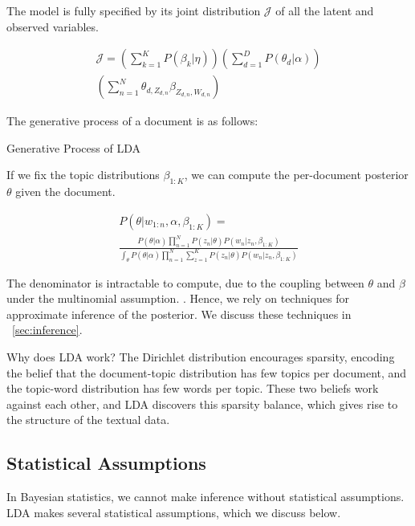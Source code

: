 \documentclass[letterpaper]{article}
\begin{document}
The model is fully specified by its joint distribution $\mathcal{J}$
of all the latent and observed variables.

\begin{multline}
 \mathcal{J} = \left( \sum_{k=1}^{K} P(\beta_k | \eta) \right) \left(
    \sum_{d=1}^{D} P(\theta_d | \alpha) \right) \\
  \left( \sum_{n=1}^{N} \theta_{d, Z_{d,n}} \beta_{Z_{d,n}, W_{d,n}} \right)  
\end{multline}

The generative process of a document is as follows:

\begin{algorithm}
  \caption{Generative Process of LDA}\label{alg:LDA}
  \begin{algorithmic}[1]
    \EndFor
    \EndFor
  \end{algorithmic}
\end{algorithm}

If we fix the topic distributions $\beta_{1:K}$, we can compute the
per-document posterior $\theta$ given the document.

\begin{multline}
  P(\theta | w_{1:n}, \alpha, \beta_{1:K}) = \\ \frac{P(\theta |
    \alpha)\prod_{n=1}^{N} P(z_n | \theta) P(w_n | z_n,
    \beta_{1:K})}{\int_\theta P(\theta | \alpha) \prod_{n=1}^N
    \sum_{z=1}^K P(z_n | \theta) P(w_n | z_n, \beta_{1:K})}
\end{multline}

The denominator is intractable to compute, due to the coupling
between $\theta$ and $\beta$ under the multinomial assumption.
\cite{blei2003latent}. Hence, we rely on techniques for approximate
inference of the posterior. We discuss these techniques in
~\autoref{sec:inference}.

Why does LDA work? The Dirichlet distribution encourages sparsity,
encoding the belief that the document-topic distribution has few
topics per document, and the topic-word distribution has few words per
topic. These two beliefs work against each other, and LDA discovers
this sparsity balance, which gives rise to the structure of the
textual data.

\subsection{Statistical Assumptions}
\label{subsec:statistical-assumptions}
In Bayesian statistics, we cannot make inference without statistical
assumptions. LDA makes several statistical assumptions, which we
discuss below.
\end{document}
